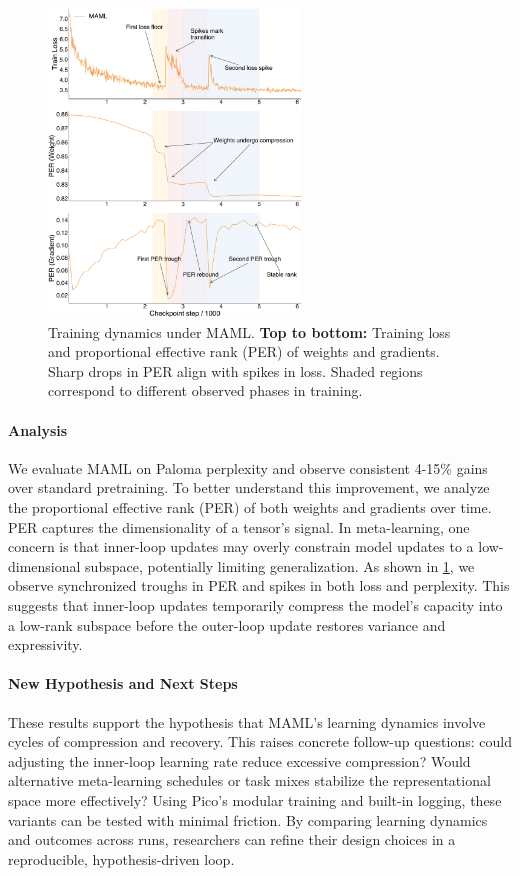 \begin{figure}[h!]
    \centering
    \includegraphics[width=0.6\textwidth]{chapters/pico/figures/maml-example.pdf}
    \caption{Training dynamics under MAML.
    \textbf{Top to bottom:} Training loss and proportional effective rank (PER) of weights and gradients.
    Sharp drops in PER align with spikes in loss. Shaded regions correspond to different observed phases in training. 
    }
    \label{fig:maml_example}
\end{figure}


\paragraph{Analysis} We evaluate MAML on Paloma perplexity and observe consistent 4-15\% gains over standard pretraining. To better understand this improvement, we analyze the proportional effective rank (PER) \citep{diehlmartinez2024tending} of both weights and gradients over time. PER captures the dimensionality of a tensor's signal. In meta-learning, one concern is that inner-loop updates may overly constrain model updates to a low-dimensional subspace, potentially limiting generalization. As shown in \cref{fig:maml_example}, we observe synchronized troughs in PER and spikes in both loss and perplexity. This suggests that inner-loop updates temporarily compress the model's capacity into a low-rank subspace before the outer-loop update restores variance and expressivity.


\paragraph{New Hypothesis and Next Steps}
These results support the hypothesis that MAML's learning dynamics involve cycles of compression and recovery. This raises concrete follow-up questions: could adjusting the inner-loop learning rate reduce excessive compression? Would alternative meta-learning schedules or task mixes stabilize the representational space more effectively? Using Pico's modular training and built-in logging, these variants can be tested with minimal friction. By comparing learning dynamics and outcomes across runs, researchers can refine their design choices in a reproducible, hypothesis-driven loop.%


